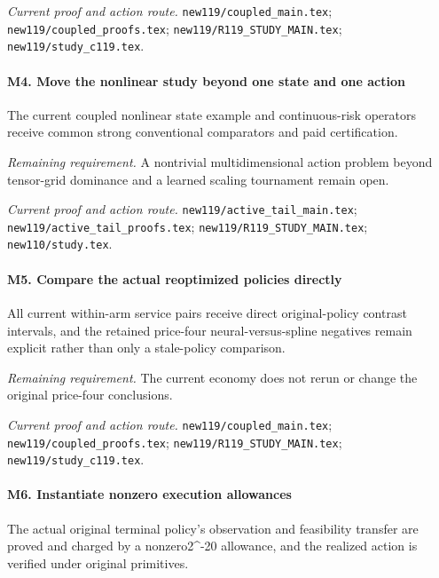 \par\emph{Current proof and action route.} \nolinkurl{new119/coupled_main.tex}; \nolinkurl{new119/coupled_proofs.tex}; \nolinkurl{new119/R119_STUDY_MAIN.tex}; \nolinkurl{new119/study_c119.tex}.

\paragraph{M4. Move the nonlinear study beyond one state and one action}

The current coupled nonlinear state example and continuous-risk operators receive common strong conventional comparators and paid certification.

\par\emph{Remaining requirement.} A nontrivial multidimensional action problem beyond tensor-grid dominance and a learned scaling tournament remain open.

\par\emph{Current proof and action route.} \nolinkurl{new119/active_tail_main.tex}; \nolinkurl{new119/active_tail_proofs.tex}; \nolinkurl{new119/R119_STUDY_MAIN.tex}; \nolinkurl{new110/study.tex}.

\paragraph{M5. Compare the actual reoptimized policies directly}

All current within-arm service pairs receive direct original-policy contrast intervals, and the retained price-four neural-versus-spline negatives remain explicit rather than only a stale-policy comparison.

\par\emph{Remaining requirement.} The current economy does not rerun or change the original price-four conclusions.

\par\emph{Current proof and action route.} \nolinkurl{new119/coupled_main.tex}; \nolinkurl{new119/coupled_proofs.tex}; \nolinkurl{new119/R119_STUDY_MAIN.tex}; \nolinkurl{new119/study_c119.tex}.

\paragraph{M6. Instantiate nonzero execution allowances}

The actual original terminal policy's observation and feasibility transfer are proved and charged by a nonzero2\textasciicircum{}-20 allowance, and the realized action is verified under original primitives.

